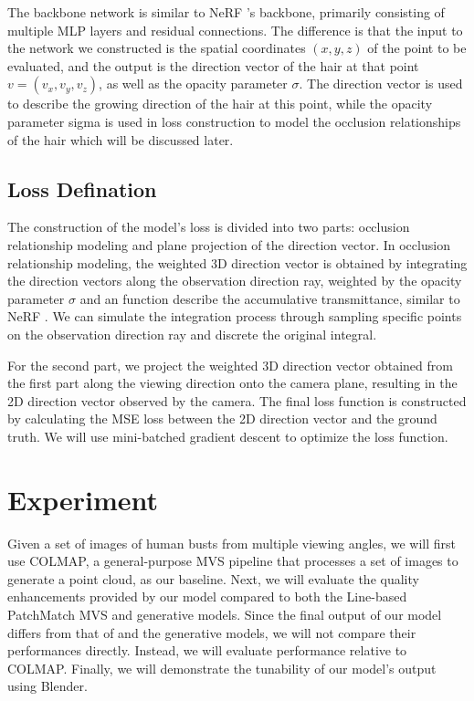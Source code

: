 \documentclass[12pt]{article}
\begin{document}
    The backbone network is similar to NeRF \cite{mildenhall_nerf_2020}'s backbone, primarily consisting of multiple MLP layers and residual connections. The difference is that the input to the network we constructed is the spatial coordinates $(x, y, z)$ of the point to be evaluated, and the output is the direction vector of the hair at that point $v = (v_x, v_y, v_z)$, as well as the opacity parameter $\sigma$. The direction vector is used to describe the growing direction of the hair at this point, while the opacity parameter sigma is used in loss construction to model the occlusion relationships of the hair which will be discussed later.
    
    \subsection{Loss Defination}
    
    The construction of the model's loss is divided into two parts: occlusion relationship modeling and plane projection of the direction vector. In occlusion relationship modeling, the weighted 3D direction vector is obtained by integrating the direction vectors along the observation direction ray, weighted by the opacity parameter $\sigma$ and an function describe the accumulative transmittance, similar to NeRF \cite{mildenhall_nerf_2020}. We can simulate the integration process through sampling specific points on the observation direction ray and discrete the original integral.

    For the second part, we project the weighted 3D direction vector obtained from the first part along the viewing direction onto the camera plane, resulting in the 2D direction vector observed by the camera. The final loss function is constructed by calculating the MSE loss between the 2D direction vector and the ground truth. We will use mini-batched gradient descent to optimize the loss function.
    
  \section{Experiment}

  Given a set of images of human busts from multiple viewing angles, we will first use COLMAP, a general-purpose MVS pipeline that processes a set of images to generate a point cloud, as our baseline. Next, we will evaluate the quality enhancements provided by our model compared to both the Line-based PatchMatch MVS \cite{nam_strand-accurate_nodate} and generative models. Since the final output of our model differs from that of \cite{nam_strand-accurate_nodate} and the generative models, we will not compare their performances directly. Instead, we will evaluate performance relative to COLMAP. Finally, we will demonstrate the tunability of our model's output using Blender.
  
  

  \printbibliography
\end{document}
